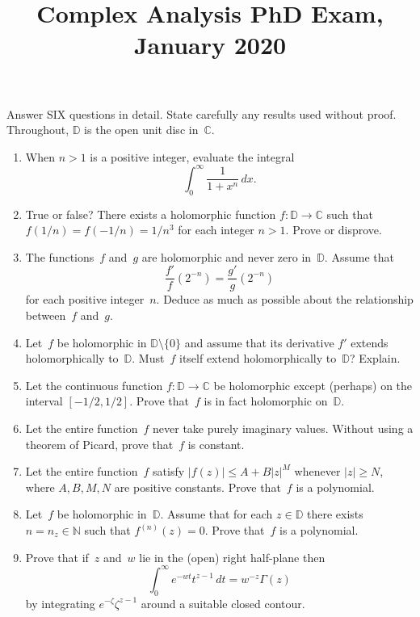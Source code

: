 \documentclass[11pt,letterpaper]{article}
\title{Complex Analysis PhD Exam, January 2020}
\author{}
\date{}
\newenvironment{examproblems}[2]{%
  \def\ProblemHeadingTag{#2}%
  \AssignTaggingSocketPlug{block/list/label}{examproblem}%
  \begin{enumerate}%
  \setcounter{enumi}{#1}%
  \renewcommand{\labelenumi}{\textbf{\theenumi.}}%
  \setlength{\topsep}{0.35em}%
  \setlength{\partopsep}{0pt}%
  \setlength{\itemsep}{0.48em}%
  \setlength{\parsep}{0.18em}%
}{\end{enumerate}}
\newenvironment{examinstructions}{%
  \par\begingroup\itshape
}{%
  \par\endgroup\vspace{0.18em}
}
\begin{document}
\maketitle
\thispagestyle{empty}
\begin{examinstructions}
Answer SIX questions in detail. State carefully any results used without proof. Throughout, \(\mathbb{D}\) is the open unit disc in~\(\mathbb{C}\).
\end{examinstructions}
\begin{examproblems}{0}{H2}
\def\ProblemHeadingText{Problem 1.}
\item
When \(n>1\) is a positive integer, evaluate the integral
\[
\int_0^\infty \frac{1}{1+x^n}\,dx.
\]
\def\ProblemHeadingText{Problem 2.}
\item
True or false? There exists a holomorphic function \(f:\mathbb{D}\to\mathbb{C}\) such that \(f(1/n)=f(-1/n)=1/n^3\) for each integer \(n>1\). Prove or disprove.
\def\ProblemHeadingText{Problem 3.}
\item
The functions~\(f\) and~\(g\) are holomorphic and never zero in~\(\mathbb{D}\). Assume that
\[
\frac{f'}{f}(2^{-n})=\frac{g'}{g}(2^{-n})
\]
 for each positive integer~\(n\). Deduce as much as possible about the relationship between~\(f\) and~\(g\).
\def\ProblemHeadingText{Problem 4.}
\item
Let~\(f\) be holomorphic in \(\mathbb{D}\setminus\{0\}\) and assume that its derivative \(f'\) extends holomorphically to~\(\mathbb{D}\). Must~\(f\) itself extend holomorphically to~\(\mathbb{D}\)? Explain.
\def\ProblemHeadingText{Problem 5.}
\item
Let the continuous function \(f:\mathbb{D}\to\mathbb{C}\) be holomorphic except (perhaps) on the interval \([-1/2,1/2]\). Prove that~\(f\) is in fact holomorphic on~\(\mathbb{D}\).
\def\ProblemHeadingText{Problem 6.}
\item
Let the entire function~\(f\) never take purely imaginary values. Without using a theorem of Picard, prove that~\(f\) is constant.
\def\ProblemHeadingText{Problem 7.}
\item
Let the entire function~\(f\) satisfy \(|f(z)|\leq A+B|z|^M\) whenever \(|z|\geq N\), where \(A,B,M,N\) are positive constants. Prove that~\(f\) is a polynomial.
\def\ProblemHeadingText{Problem 8.}
\item
Let~\(f\) be holomorphic in~\(\mathbb{D}\). Assume that for each \(z\in\mathbb{D}\) there exists \(n=n_z\in\mathbb{N}\) such that \(f^{(n)}(z)=0\). Prove that~\(f\) is a polynomial.
\def\ProblemHeadingText{Problem 9.}
\item
Prove that if~\(z\) and~\(w\) lie in the (open) right half-plane then
\[
\int_0^\infty e^{-wt}t^{z-1}\,dt=w^{-z}\Gamma(z)
\]
 by integrating \(e^{-\zeta}\zeta^{z-1}\) around a suitable closed contour.
\end{examproblems}
\end{document}
